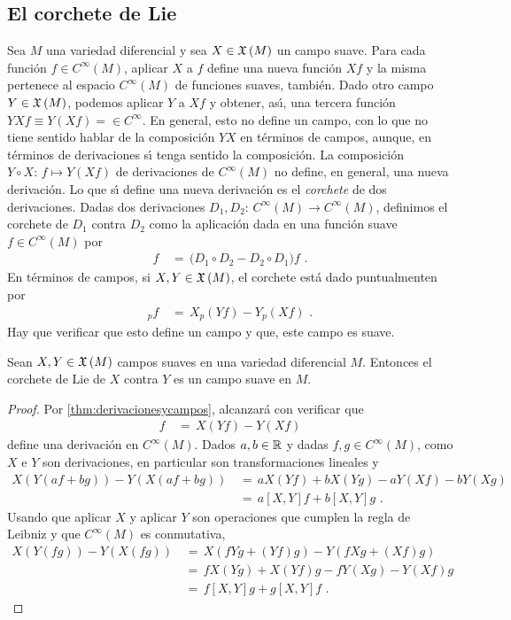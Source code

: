 \subsection{El corchete de Lie}
Sea $M$ una variedad diferencial y sea $X\in\mathfrak{X}\left(M\right)$ un campo suave.
Para cada funci\'{o}n $f\in C^{\infty}(M)$, aplicar $X$ a $f$ define una
nueva funci\'{o}n $Xf$ y la misma pertenece al espacio $C^{\infty}(M)$ de
funciones suaves, tambi\'{e}n. Dado otro campo $Y\in\mathfrak{X}\left(M\right)$, podemos
aplicar $Y$ a $Xf$ y obtener, as\'{\i}, una tercera funci\'{o}n
$YXf\equiv Y(Xf)=\in C^{\infty}$. En general, esto no define un campo, con
lo que no tiene sentido hablar de la composici\'{o}n $YX$ en t\'{e}rminos
de campos, aunque, en t\'{e}rminos de derivaciones s\'{\i} tenga sentido
la composici\'{o}n. La composici\'{o}n $Y\circ X:\,f\mapsto Y(Xf)$ de
derivaciones de $C^{\infty}(M)$ no define, en general, una nueva
derivaci\'{o}n. Lo que s\'{\i} define una nueva derivaci\'{o}n es el
\emph{corchete} de dos derivaciones. Dadas dos derivaciones
$D_{1},D_{2}:\,C^{\infty}(M)\rightarrow C^{\infty}(M)$, definimos el
corchete de $D_{1}$ contra $D_{2}$ como la aplicaci\'{o}n dada en
una funci\'{o}n suave $f\in C^{\infty}(M)$ por
\begin{align*}
	[D_{1},D_{2}]f & \,=\,\big(D_{1}\circ D_{2} - D_{2}\circ D_{1}\big)f
	\text{ .}
\end{align*}
%
En t\'{e}rminos de campos, si $X,Y\in\mathfrak{X}\left(M\right)$, el corchete est\'{a}
dado puntualmenten por
\begin{align*}
	[X,Y]_{p}f & \,=\,X_{p}(Yf) -Y_{p}(Xf)
	\text{ .}
\end{align*}
%
Hay que verificar que esto define un campo y que, este campo es suave.

\begin{lemaElCorcheteEsSuave}\label{thm:elcorcheteessuave}
	Sean $X,Y\in\mathfrak{X}\left(M\right)$ campos suaves en una variedad diferencial
	$M$. Entonces el corchete de Lie de $X$ contra $Y$ es un
	campo suave en $M$.
\end{lemaElCorcheteEsSuave}

\begin{proof}
	Por \ref{thm:derivacionesycampos}, alcanzar\'{a} con verificar que
	\begin{align*}
		[X,Y]f & \,=\,X(Yf)-Y(Xf)
	\end{align*}
	define una derivaci\'{o}n en $C^{\infty}(M)$. Dados $a,b\in\mathbb{R}$
	y dadas $f,g\in C^{\infty}(M)$, como $X$ e $Y$ son derivaciones,
	en particular son transformaciones lineales y
	\begin{align*}
		X(Y(af+bg))-Y(X(af+bg)) & \,=\,aX(Yf)+bX(Yg)-aY(Xf)-bY(Xg) \\
		& \,=\,a[X,Y]f+b[X,Y]g
		\text{ .}
	\end{align*}
	Usando que aplicar $X$ y aplicar $Y$ son operaciones que cumplen
	la regla de Leibniz y que $C^{\infty}(M)$ es conmutativa,
	\begin{align*}
		X(Y(fg))-Y(X(fg)) & \,=\,X(fYg+(Yf)g)-Y(fXg+(Xf)g) \\
		& \,=\,fX(Yg)+X(Yf)g-fY(Xg)-Y(Xf)g \\
		& \,=\,f[X,Y]g + g[X,Y]f
		\text{ .}
	\end{align*}
\end{proof}

